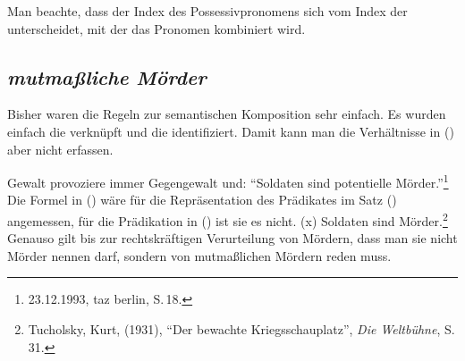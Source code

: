 Man beachte, dass der Index des Possessivpronomens sich vom Index der \nbar unterscheidet, mit der
das Pronomen kombiniert wird.

\subsection{\emph{mutmaßliche Mörder}}
\label{Abschnitt-Semantik-Adjektivmodifikation-mutmaßlich}

Bisher waren die Regeln zur semantischen Komposition sehr einfach. Es wurden einfach die \relslen
verknüpft und die \ltopwe identifiziert. Damit kann man die Verhältnisse in () aber nicht erfassen.

\ea
\label{soldat}

Gewalt provoziere immer Gegengewalt und: "`Soldaten sind potentielle Mörder."'\footnote{
23.12.1993, taz berlin, S.\,18.
}
\z
Die Formel in () wäre für die Repräsentation des Prädikates im Satz () angemessen, für
die Prädikation in () ist sie es nicht.
\ea
{}(x)
\z
\ea
Soldaten sind Mörder.\footnote{
  Tucholsky, Kurt, (1931), "`Der bewachte Kriegsschauplatz"', \emph{Die Weltbühne}, S.\,31.
}
\z
Genauso gilt bis zur rechtskräftigen Verurteilung von Mördern, dass man sie nicht Mörder nennen
darf, sondern von mutmaßlichen Mördern reden muss. 

